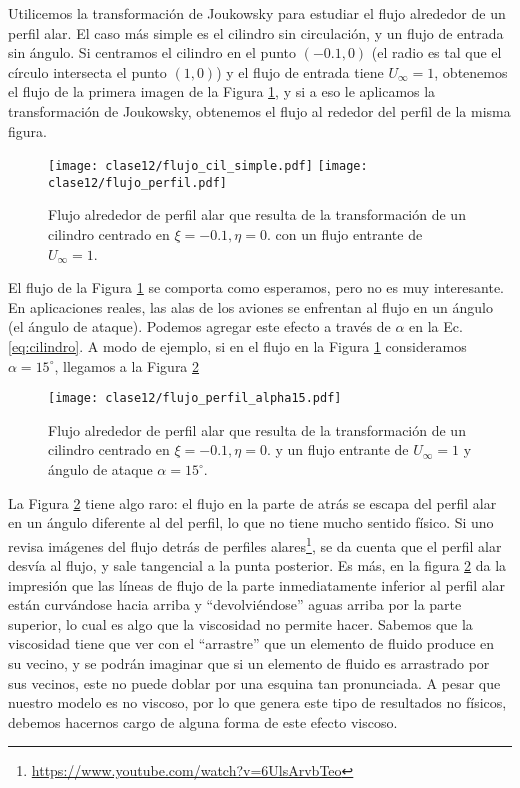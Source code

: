Utilicemos la transformación de Joukowsky para estudiar el flujo alrededor de un perfil alar.
El caso más simple es el cilindro sin circulación, y un flujo de entrada sin ángulo.
Si centramos el cilindro en el punto $(-0.1,0)$ (el radio es tal que el círculo intersecta el punto $(1,0)$) y el flujo de entrada tiene $U_\infty=1$, obtenemos el flujo de la primera imagen de la Figura \ref{fig:flujo_cil_simple}, y si a eso le aplicamos la transformación de Joukowsky, obtenemos el flujo al rededor del perfil de la misma figura.
%
\begin{figure}[h!]
\centering
\texttt{[image: clase12/flujo\_cil\_simple.pdf]}
\texttt{[image: clase12/flujo\_perfil.pdf]}
\caption{Flujo alrededor de perfil alar que resulta de la transformación de un cilindro centrado en $\xi=-0.1, \eta=0.$ con un flujo entrante de $U_\infty=1$.}\label{fig:flujo_cil_simple}
\end{figure}

El flujo de la Figura \ref{fig:flujo_cil_simple} se comporta como esperamos, pero no es muy interesante.
En aplicaciones reales, las alas de los aviones se enfrentan al flujo en un ángulo (el ángulo de ataque).
Podemos agregar este efecto a través de $\alpha$ en la Ec. \eqref{eq:cilindro}.
A modo de ejemplo, si en el flujo en la Figura \ref{fig:flujo_cil_simple} consideramos $\alpha=15^\circ$, llegamos a la Figura \ref{fig:flujo_perfil_alpha15} 
%
\begin{figure}[h!]
\centering
\texttt{[image: clase12/flujo\_perfil\_alpha15.pdf]}
\caption{Flujo alrededor de perfil alar que resulta de la transformación de un cilindro centrado en $\xi=-0.1, \eta=0.$ y un flujo entrante de $U_\infty=1$ y ángulo de ataque $\alpha=15^\circ$.}\label{fig:flujo_perfil_alpha15}
\end{figure}

La Figura \ref{fig:flujo_perfil_alpha15} tiene algo raro: el flujo en la parte de atrás se escapa del perfil alar en un ángulo diferente al del perfil, lo que no tiene mucho sentido físico.
Si uno revisa imágenes del flujo detrás de perfiles alares\footnote{\url{https://www.youtube.com/watch?v=6UlsArvbTeo}}, se da cuenta que el perfil alar desvía al flujo, y sale tangencial a la punta posterior.
Es más, en la figura \ref{fig:flujo_perfil_alpha15} da la impresión que las líneas de flujo de la parte inmediatamente inferior al perfil alar están curvándose hacia arriba y ``devolviéndose'' aguas arriba por la parte superior, lo cual es algo que la viscosidad no permite hacer.
Sabemos que la viscosidad tiene que ver con el ``arrastre'' que un elemento de fluido produce en su vecino, y se podrán imaginar que si un elemento de fluido es arrastrado por sus vecinos, este no puede doblar por una esquina tan pronunciada.
A pesar que nuestro modelo es no viscoso, por lo que genera este tipo de resultados no físicos, debemos hacernos cargo de alguna forma de este efecto viscoso.

